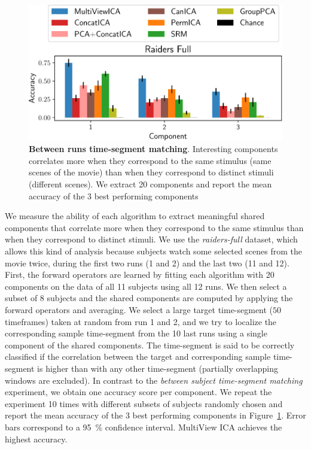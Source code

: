 \documentclass{report}
\begin{document}
\begin{figure}
  \centering
  \includegraphics[width=\textwidth]{figures/mvica/swetha_exp_full_fit.pdf}
  \caption{\textbf{Between runs time-segment matching}. Interesting components correlates more when they correspond to the same stimulus (same scenes of the movie) than when they correspond to distinct stimuli (different scenes).
  We extract 20 components and report the mean accuracy of the 3 best performing components}
  \label{fig:swetha}
\end{figure}

We measure the ability of each algorithm to extract meaningful shared components that correlate more when they correspond to the same stimulus than when they correspond to distinct stimuli. We use the \emph{raiders-full} dataset, which allows this kind of analysis because subjects watch some selected scenes from the movie twice, during the first two runs (1 and 2) and the last two (11 and 12).
%
First, the forward operators are learned by fitting each algorithm with 20 components on the data of all 11 subjects using all 12 runs. We then select a subset of 8 subjects and the shared components are computed by applying the forward operators and averaging.
%
We select a large target time-segment ($50$
timeframes) taken at random from run 1 and 2, and we try to localize the corresponding sample time-segment from the 10 last runs using a single component of the shared components.
%
The time-segment is said to be
correctly classified if the correlation between the target and corresponding sample
time-segment is higher than with any other time-segment (partially overlapping windows are excluded).
%
In contrast to the \emph{between subject time-segment matching} experiment, we obtain one accuracy score per component.
%
We repeat the experiment 10 times with different subsets of subjects randomly chosen and report the mean accuracy of the 3 best performing components in Figure~\ref{fig:swetha}. Error bars correspond to a 95~\% confidence interval.
%
MultiView ICA achieves the highest accuracy.
\end{document}
